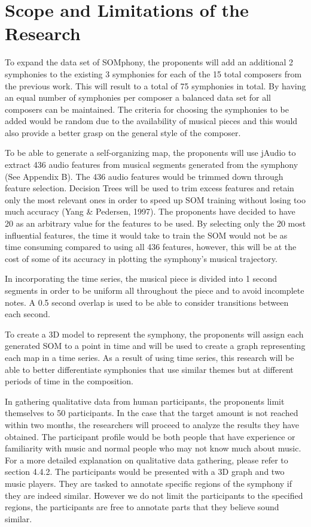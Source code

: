 \section{Scope and Limitations of the Research}
\label{sec:scopelimitations}
To expand the data set of SOMphony, the proponents will add an additional 2 symphonies to the existing 3 symphonies for each of the 15 total composers from the previous work. This will result to a total of 75 symphonies in total. By having an equal number of symphonies per composer a balanced data set for all composers can be maintained. The criteria for choosing the symphonies to be added would be random due to the availability of musical pieces and  this would also provide a better grasp on the general style of the composer.

To be able to generate a self-organizing map, the proponents will use jAudio to extract 436 audio features from musical segments generated from the symphony (See Appendix B). The 436 audio features would be trimmed down through feature selection. Decision Trees will be used to trim excess features and retain only the most relevant ones in order to speed up SOM training without losing too much accuracy (Yang \& Pedersen, 1997). The proponents have decided to have 20 as an arbitrary value for the features to be used. By selecting only the 20 most influential features, the time it would take to train the SOM would not be as time consuming compared to using all 436 features, however, this will be at the cost of some of its accuracy in plotting the symphony’s musical trajectory.

In incorporating the time series, the musical piece is divided into 1 second segments in order to be uniform all throughout the piece and to avoid incomplete notes. A 0.5 second overlap is used to be able to consider transitions between each second. 

To create a 3D model to represent the symphony, the proponents will assign each generated SOM to a point in time and will be used to create a graph representing each map in a time series. As a result of using time series, this research will be able to better differentiate symphonies that use similar themes but at different periods of time in the composition.

In gathering qualitative data from human participants, the proponents limit themselves to 50 participants. In the case that the target amount is not reached within two months, the researchers will proceed to analyze the results they have obtained. The participant profile would be both people that have experience or familiarity with music and normal people who may not know much about music. For a more detailed explanation on qualitative data gathering, please refer to section 4.4.2. The participants would be presented with a 3D graph and two music players. They are tasked to annotate specific regions of the symphony if they are indeed similar. However we do not limit the participants to the specified regions, the participants are free to annotate parts that they believe sound similar. 

